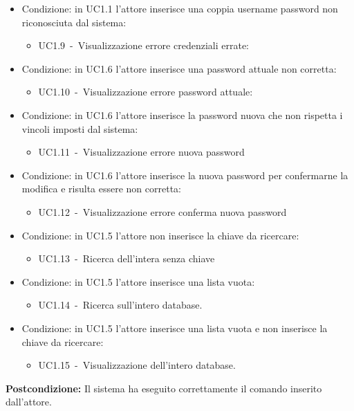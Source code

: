 \documentclass{scalatekids-article}
\begin{document}
\begin{itemize}
\item Condizione: in UC1.1 l'attore inserisce una coppia username password non riconosciuta dal sistema:
  \begin{itemize}
  \item UC1.9\ -\ Visualizzazione errore credenziali errate:
  \end{itemize}
\item Condizione: in UC1.6 l'attore inserisce una password attuale non corretta:
  \begin{itemize}
  \item UC1.10\ -\ Visualizzazione errore password attuale:
  \end{itemize}
\item Condizione: in UC1.6 l'attore inserisce la password nuova che non rispetta i vincoli imposti dal sistema: %
  \begin{itemize}
  \item UC1.11\ -\ Visualizzazione errore nuova password
  \end{itemize}
\item Condizione: in UC1.6 l'attore inserisce la nuova password per confermarne la modifica e risulta essere non corretta: %
  \begin{itemize}
  \item UC1.12\ -\ Visualizzazione errore conferma nuova password
  \end{itemize}
\item Condizione: in UC1.5 l'attore non inserisce la chiave da ricercare:
  \begin{itemize}
  \item UC1.13\ -\ Ricerca dell'intera  senza chiave
  \end{itemize}
\item Condizione: in UC1.5 l'attore inserisce una lista  vuota:
  \begin{itemize}
  \item UC1.14\ -\ Ricerca sull'intero database.
  \end{itemize}
\item Condizione: in UC1.5 l'attore inserisce una lista  vuota e non inserisce la chiave da ricercare:
  \begin{itemize}
  \item UC1.15\ -\ Visualizzazione dell'intero database.
  \end{itemize}
\end{itemize}
\textbf{Postcondizione:} Il sistema ha eseguito correttamente il comando inserito dall'attore.
\end{document}
